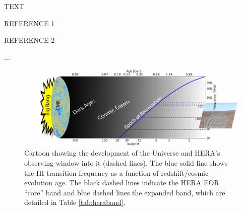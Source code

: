 \documentclass[ars]{/Users/daviddeboer1/Documents/Papers/Copernicus_LaTeX_Package_v_2_7/copernicus}
\def\HI{{H{\small I }}}
\begin{document}
\begin{acknowledgements}
TEXT
\end{acknowledgements}




\begin{thebibliography}{}

REFERENCE 1

REFERENCE 2

...

\end{thebibliography}




\begin{figure}[ht]
\vspace*{2mm}
\begin{center}
\includegraphics[width=\textwidth]{plots/herauniall.png}
\end{center}
\caption{\small Cartoon showing the development of the Universe and HERA's observing window into it (dashed lines).  The blue solid
line shows the \HI transition frequency as a function of redshift/cosmic evolution age.  The black dashed lines indicate the HERA EOR ``core'' band and blue dashed lines the expanded band, which are detailed in Table \ref{tab:heraband}.}
\label{fig:theUniverse}
\end{figure}
\end{document}
